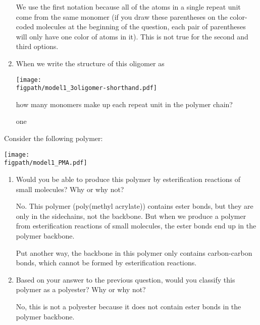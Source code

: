 \begin{activity}
\begin{ctqs}
\begin{enumerate}
				\begin{solution}[1.5in]
					We use the first notation because all of the atoms in a single repeat unit come from the same monomer (if you draw these parentheses on the color-coded molecules at the beginning of the question, each pair of parentheses will only have one color of atoms in it).  This is not true for the second and third options.
				\end{solution}
	
			\item When we write the structure of this oligomer as
	
	\centerline{\texttt{[image: \\figpath/model1\_3oligomer-shorthand.pdf]}}
	
	how many monomers make up each repeat unit in the polymer chain?
			
				\begin{solution}[0.5in]
					one
				\end{solution}
			
		\end{enumerate}
	
	\question Consider the following polymer:
	
	\centerline{\texttt{[image: \\figpath/model1\_PMA.pdf]}}
	
		\begin{enumerate}
		
			\item Would you be able to produce this polymer by esterification reactions of small molecules?  Why or why not?
			
				\begin{solution}[1.75in]
					No.  This polymer (poly(methyl acrylate)) contains ester bonds, but they are only in the sidechains, not the backbone.  But when we produce a polymer from esterification reactions of small molecules, the ester bonds end up in the polymer backbone.
					
					Put another way, the backbone in this polymer only contains carbon-carbon bonds, which cannot be formed by esterification reactions.
				\end{solution}
			
			\item Based on your answer to the previous question, would you classify this polymer as a polyester?  Why or why not?
			
				\begin{solution}[1.25in]
					No, this is not a polyester because it does not contain ester bonds in the polymer backbone.
				\end{solution}
			

\end{enumerate}
\end{ctqs}
\end{activity}
